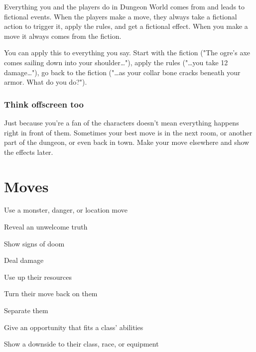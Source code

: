 Everything you and the players do in Dungeon World comes from and leads to fictional events. When the players make a move, they always take a fictional action to trigger it, apply the rules, and get a fictional effect. When you make a move it always comes from the fiction.

 

You can apply this to everything you say. Start with the fiction ("The ogre's axe comes sailing down into your shoulder…"), apply the rules ("…you take 12 damage…"), go back to the fiction ("…as your collar bone cracks beneath your armor. What do you do?").

 
\subsubsection{Think offscreen too}   
 

Just because you're a fan of the characters doesn't mean everything happens right in front of them. Sometimes your best move is in the next room, or another part of the dungeon, or even back in town. Make your move elsewhere and show the effects later.

 
\section{Moves}   
 
\startitemize[1,packed]

\item Use a monster, danger, or location move

 
\item Reveal an unwelcome truth

 
\item Show signs of doom

 
\item Deal damage

 
\item Use up their resources

 
\item Turn their move back on them

 
\item Separate them

 
\item Give an opportunity that fits a class' abilities

 
\item Show a downside to their class, race, or equipment

